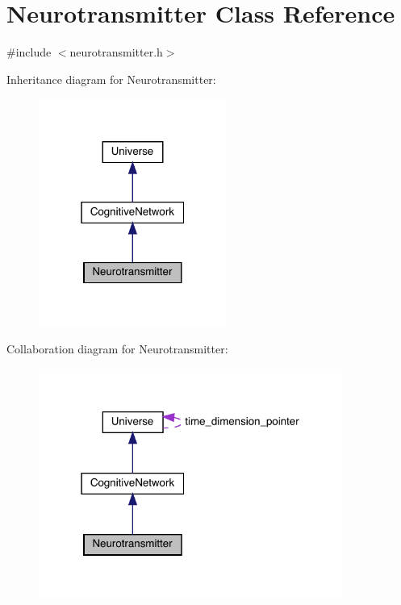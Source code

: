 \hypertarget{class_neurotransmitter}{}\section{Neurotransmitter Class Reference}
\label{class_neurotransmitter}


{\ttfamily \#include $<$neurotransmitter.\+h$>$}



Inheritance diagram for Neurotransmitter\+:\nopagebreak
\begin{figure}[H]
\begin{center}
\leavevmode
\includegraphics[width=175pt]{class_neurotransmitter__inherit__graph}
\end{center}
\end{figure}


Collaboration diagram for Neurotransmitter\+:
\nopagebreak
\begin{figure}[H]
\begin{center}
\leavevmode
\includegraphics[width=283pt]{class_neurotransmitter__coll__graph}
\end{center}
\end{figure}
